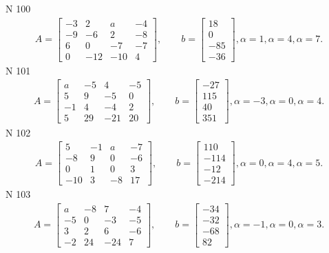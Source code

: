 \documentclass[11pt]{report}
\begin{document}
N 100
\begin{align*}
 A = \left[\begin{matrix}-3 & 2 & a & -4\\-9 & -6 & 2 & -8\\6 & 0 & -7 & -7\\0 & -12 & -10 & 4\end{matrix}\right],
    \qquad b = \left[\begin{matrix}18\\0\\-85\\-36\end{matrix}\right], \alpha = 1, \alpha = 4, \alpha = 7. 
 \end{align*}
N 101
\begin{align*}
 A = \left[\begin{matrix}a & -5 & 4 & -5\\5 & 9 & -5 & 0\\-1 & 4 & -4 & 2\\5 & 29 & -21 & 20\end{matrix}\right],
    \qquad b = \left[\begin{matrix}-27\\115\\40\\351\end{matrix}\right], \alpha = -3, \alpha = 0, \alpha = 4. 
 \end{align*}
N 102
\begin{align*}
 A = \left[\begin{matrix}5 & -1 & a & -7\\-8 & 9 & 0 & -6\\0 & 1 & 0 & 3\\-10 & 3 & -8 & 17\end{matrix}\right],
    \qquad b = \left[\begin{matrix}110\\-114\\-12\\-214\end{matrix}\right], \alpha = 0, \alpha = 4, \alpha = 5. 
 \end{align*}
N 103
\begin{align*}
 A = \left[\begin{matrix}a & -8 & 7 & -4\\-5 & 0 & -3 & -5\\3 & 2 & 6 & -6\\-2 & 24 & -24 & 7\end{matrix}\right],
    \qquad b = \left[\begin{matrix}-34\\-32\\-68\\82\end{matrix}\right], \alpha = -1, \alpha = 0, \alpha = 3. 
 \end{align*}
\end{document}

